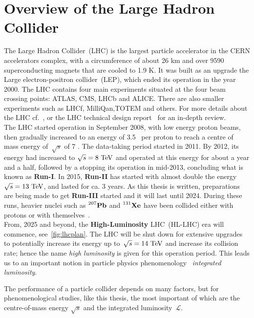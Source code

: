 \section{Overview of the Large Hadron Collider \label{sec:theLHC}}
\par The Large Hadron Collider~(LHC) is the largest particle accelerator in the CERN accelerators complex, with a circumference of about 26 \si{\kilo\metre} and over 9590 superconducting magnets that are cooled to 1.9 \si{\kelvin}. It was built as an upgrade the Large electron-positron collider~(LEP), which ended its operation in the year 2000. The LHC contains four main experiments situated at the four beam crossing points: ATLAS, CMS, LHCb and ALICE. There are also smaller experiments such as LHCf, MilliQan,TOTEM and others. For more details about the LHC cf.~\cite{cernfacts,welt-machine}, or the LHC technical design report~\cite{Bruning:2004ej} for an in-depth review.\\   The LHC started operation in September 2008, with low energy proton beams, then gradually increased to an energy of 3.5 \TeV\ per proton to reach a centre of mass energy of~$\sqrt{s}$ of 7 \TeV. The data-taking period started in 2011. By 2012, its energy had increased to $\sqrt{s}= 8\ \TeV$ and operated at this energy for about a year and a half, followed by a stopping its operation in mid-2013, concluding what is known as \textbf{Run-I}. In 2015,  \textbf{Run-II} has started with almost double the energy $\sqrt{s}= 13\ \TeV$, and lasted for ca. 3 years. As this thesis is written, preparations are being made to get \textbf{Run-III} started and it will last until 2024. During these runs, heavier nuclei such as $\prescript{207}{}{\mathbf{Pb}}$ and $\prescript{131}{}{\mathbf{Xe}}$ have been collided either with protons or with themselves~\cite{lhckomission}.  \\  From, 2025 and beyond, the \textbf{High-Luminosity} LHC~(HL-LHC) era will commence, see~\autoref{fig:lhcplan}.  The LHC will be shut down for extensive upgrades ~\cite{Apollinari:2015bam} to potentially increase its energy up to~$\sqrt{s}= 14\ \TeV$ and increase its collision rate; hence the name \emph{high luminosity} is given for this operation period. This leads us to an important notion in particle physics phenomenology ~\emph{integrated luminosity}.\\
\par The performance of a particle collider depends on many factors, but for phenomenological studies, like this thesis, the most important of which are the centre-of-mass energy $\sqrt{s}$ and the integrated luminosity~$\mathscr{L}$.
